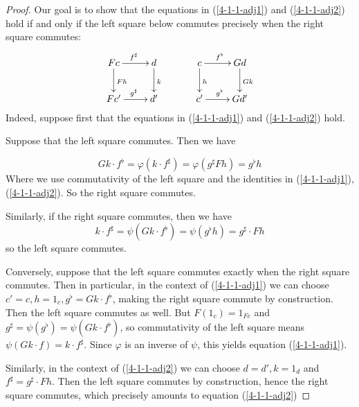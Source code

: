 \documentclass[../../solutions]{subfiles}
\begin{document}
\begin{proof}
Our goal is to show that the equations in (\ref{4-1-1-adj1}) and (\ref{4-1-1-adj2}) hold if and only if the left square below commutes precisely when the right square commutes:
\[
\xymatrix{
 Fc\ar[d]^{Fh} \ar[r]^{f^\sharp} & d \ar[d]^{k}\\
 Fc'\ar[r]^{g^\sharp} & d'
} \ \ \ \ \ \ \ \ \ 
\xymatrix{
 c\ar[d]^{h} \ar[r]^{f^\flat} & Gd \ar[d]^{Gk}\\
 c'\ar[r]^{g^\flat} & Gd'
} 
\]
Indeed, suppose first that the equations in (\ref{4-1-1-adj1}) and (\ref{4-1-1-adj2}) hold.

Suppose that the left square commutes. Then we have

\[
Gk \cdot f^\flat = \varphi(k \cdot f^\sharp) = \varphi(g^\sharp Fh) = g^\flat h 
\]
Where we use commutativity of the left square and the identities in (\ref{4-1-1-adj1}), (\ref{4-1-1-adj2}). So the right square commutes. 

Similarly, if the right square commutes, then we have
\[
k \cdot f^\sharp = \psi(Gk \cdot f^\flat) = \psi (g^\flat h) = g^\sharp \cdot Fh
\]
so the left square commutes.

Conversely, suppose that the left square commutes exactly when the right square commutes. Then in particular, in the context of (\ref{4-1-1-adj1}) we can choose $c' = c, h = 1_{c}, g^\flat =Gk \cdot f^\flat$, making the right square commute by construction. Then the left square commutes as well. But $F(1_c)=1_{Fc}$ and $g^\sharp = \psi(g^\flat)=\psi(Gk\cdot f^\flat)$, so commutativity of the left square means $\psi(Gk\cdot f) = k\cdot f^\sharp$. Since $\varphi$ is an inverse of $\psi$, this yields equation (\ref{4-1-1-adj1}). 

Similarly, in the context of (\ref{4-1-1-adj2}) we can choose $d = d', k = 1_d$ and $f^\sharp = g^\sharp \cdot Fh$. Then the left square commutes by construction, hence the right square commutes, which precisely amounts to equation (\ref{4-1-1-adj2})
\end{proof}
\end{document}
